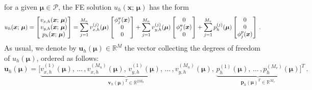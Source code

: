 \documentclass[12pt, a4paper, twoside, openright, notitlepage]{report}
\numberwithin{equation}{chapter}
\theoremstyle{theorem}
\theoremstyle{definition}
\theoremstyle{remark}
\theoremstyle{proposition}
\numberwithin{figure}{chapter}
\newcommand{\bg}[1]{\boldsymbol{#1}}
\begin{document}
		for a given $\bg{\mu} \in \mathcal{P}$, the FE solution $u_h(\bg{x}; \, \bg{\mu})$ has the form
		\begin{equation*}
			u_h(\bg{x}; \, \bg{\mu}) = 
			\begin{bmatrix}
			\hspace*{-0.15cm}
			\begin{array}{c}
				v_{x,h}(\bg{x}; \, \bg{\mu}) \\
				v_{y,h}(\bg{x}; \, \bg{\mu}) \\
				p_{h}(\bg{x}; \, \bg{\mu})
			\end{array} 
			\hspace*{-0.15cm}
			\end{bmatrix}
			= \sum_{j = 1}^{M_n} v_{x,h}^{(j)}(\bg{\mu}) 
			\begin{bmatrix}
			\hspace*{-0.15cm}
			\begin{array}{c}
				\phi_j^{\bg{v}}(\bg{x}) \\ 
				0 \\ 
				0 
			\end{array} 
			\hspace*{-0.15cm}
			\end{bmatrix}
			+
			\sum_{j = 1}^{M_n} v_{y,h}^{(j)}(\bg{\mu}) 
			\begin{bmatrix}
			\hspace*{-0.15cm}
			\begin{array}{c}
				0 \\
				\phi_j^{\bg{v}}(\bg{x}) \\  
				0 
			\end{array} 
			\hspace*{-0.15cm}
			\end{bmatrix}
			+
			\sum_{j = 1}^{M_v} p_h^{(j)}(\bg{\mu})
			\begin{bmatrix}
			\hspace*{-0.15cm}
			\begin{array}{c}
				0 \\
				0 \\  
				\phi_j^{p}(\bg{x}) 
			\end{array} 
			\hspace*{-0.15cm}
			\end{bmatrix} \, .
		\end{equation*}
		As usual, we denote by $\mathbf{u}_h(\bg{\mu}) \in \mathbb{R}^M$ the vector collecting the degrees of freedom of $u_h(\bg{\mu})$, ordered as follows:
		\begin{equation*}
			\mathbf{u}_h(\bg{\mu}) = \big[ \underbrace{v_{x,h}^{(1)}(\bg{\mu}), \, \ldots \, , v_{x,h}^{(M_n)}(\bg{\mu}), \, v_{y,h}^{(1)}(\bg{\mu}), \, \ldots \, , v_{y,h}^{(M_n)}(\bg{\mu})}_{\mathbf{v}_h(\bg{\mu})^T \in \mathbb{R}^{2 M_n}}, \, \underbrace{p_h^{(1)}(\bg{\mu}), \, \ldots \, , p_h^{(M_v)}(\bg{\mu})}_{\mathbf{p}_h(\bg{\mu})^T \in \mathbb{R}^{M_v}} \big]^T \, .
		\end{equation*}
\end{document}
